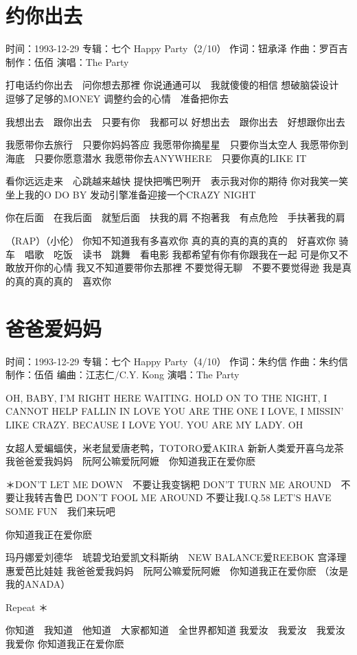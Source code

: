 \documentclass[UTF8,a4paper,oneside,twocolumn,12pt]{ctexbook}
\newcommand{\infopair}[2]{\textbullet #1：#2}
\newcommand{\zc}[1][伍佰]{\infopair{作词}{#1}}
\newcommand{\zq}[1][伍佰]{\infopair{作曲}{#1}}
\newcommand{\bq}[1][伍佰]{\infopair{编曲}{#1}}
\newcommand{\zj}[1]{\infopair{专辑}{#1}}
\newcommand{\zz}[1]{\infopair{制作}{#1}}
\newcommand{\sj}[1]{\infopair{时间}{#1}}
\newenvironment{info}{\begin{flushleft}\kaishu
	}
	{\end{flushleft}\normalsize\yahei\par}
\newenvironment{lyric}{
	}
{}
\begin{document}
\section{约你出去}
\begin{info}
	\sj{1993-12-29}
	\zj{七个 Happy Party（2/10）}
	\zc[钮承泽]
	\zq[罗百吉]
	\zz{伍佰}
	\infopair{演唱}{The Party}
\end{info}
\begin{lyric}
	打电话约你出去　问你想去那裡
	你说通通可以　我就傻傻的相信
	想破脑袋设计　逗够了足够的MONEY
	调整约会的心情　准备把你去

	我想出去　跟你出去　只要有你　我都可以
	好想出去　跟你出去　好想跟你出去

	我愿带你去旅行　只要你妈妈答应
	我愿带你摘星星　只要你当太空人
	我愿带你到海底　只要你愿意潜水
	我愿带你去ANYWHERE　只要你真的LIKE IT

	看你远远走来　心跳越来越快
	提快把嘴巴咧开　表示我对你的期待
	你对我笑一笑　坐上我的O DO BY
	发动引擎准备迎接一个CRAZY NIGHT

	你在后面　在我后面　就堑后面　扶我的肩
	不抱著我　有点危险　手扶著我的肩

	（RAP）（小伦）
	你知不知道我有多喜欢你
	真的真的真的真的真的　好喜欢你
	骑车　唱歌　吃饭　读书　跳舞　看电影
	我都希望有你有你跟我在一起
	可是你又不敢放开你的心情
	我又不知道要带你去那裡
	不要觉得无聊　不要不要觉得逊
	我是真的真的真的真的　喜欢你
\end{lyric}

\section{爸爸爱妈妈}
\begin{info}
	\sj{1993-12-29}
	\zj{七个 Happy Party（4/10）}
	\zc[朱约信]
	\zq[朱约信]
	\zz{伍佰}
	\bq[江志仁/C.Y. Kong]
	\infopair{演唱}{The Party}
\end{info}
\begin{lyric}
	OH, BABY, I'M RIGHT HERE WAITING. HOLD ON TO
	THE NIGHT, I CANNOT HELP FALLIN IN LOVE
	YOU ARE THE ONE I LOVE, I MISSIN' LIKE CRAZY.
	BECAUSE I LOVE YOU.
	YOU ARE MY LADY. OH

	女超人爱蝙蝠侠，米老鼠爱唐老鸭，TOTORO爱AKIRA
	新新人类爱开喜乌龙茶
	我爸爸爱我妈妈　阮阿公嘛爱阮阿嬷　你知道我正在爱你麽

	＊DON'T LET ME DOWN　不要让我变锅粑
	DON'T TURN ME AROUND　不要让我转吉鲁巴
	DON'T FOOL ME AROUND 不要让我I.Q.58
	LET'S HAVE SOME FUN　我们来玩吧

	你知道我正在爱你麽

	玛丹娜爱刘德华　琥碧戈珀爱凯文科斯纳　NEW BALANCE爱REEBOK
	宫泽理惠爱芭比娃娃
	我爸爸爱我妈妈　阮阿公嘛爱阮阿嬷　你知道我正在爱你麽
	（汝是我的ANADA）

	Repeat ＊

	你知道　我知道　他知道　大家都知道　全世界都知道
	我爱汝　我爱汝　我爱汝　我爱你
	你知道我正在爱你麽
\end{lyric}
\end{document}
